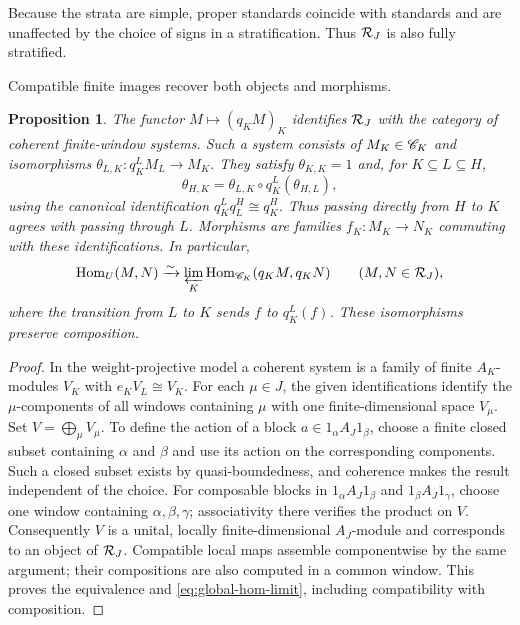 \documentclass[11pt,reqno]{amsart}
\newcommand{\Hom}{\operatorname{Hom}}\newcommand{\End}{\operatorname{End}}\newcommand{\Ext}{\operatorname{Ext}}
\newtheorem{proposition}[theorem]{Proposition}
\theoremstyle{definition}
\theoremstyle{remark}
\numberwithin{equation}{section}
\begin{document}
Because the strata are simple, proper standards coincide with
standards and are unaffected by the choice of signs in a
stratification. Thus $\mathcal R_J$ is also fully stratified.

Compatible finite images recover both objects and morphisms.

\begin{proposition}\label{prop:coherent-reconstruction}
The functor $M\mapsto(q_KM)_K$ identifies $\mathcal R_J$ with the category
of coherent finite-window systems. Such a system consists of
$M_K\in\mathscr C_K$ and isomorphisms
$\theta_{L,K}:q_K^LM_L\to M_K$. They satisfy $\theta_{K,K}=1$ and,
for $K\subseteq L\subseteq H$,
\[
 \theta_{H,K}=\theta_{L,K}\circ q_K^L(\theta_{H,L}),
\]
using the canonical identification $q_K^Lq_L^H\cong q_K^H$.
Thus passing directly from $H$ to $K$ agrees with passing through $L$.
Morphisms are families $f_K:M_K\to N_K$ commuting with these
identifications. In particular,
\begin{equation}\label{eq:global-hom-limit}
 \Hom_U(M,N)\xrightarrow{\sim}
 \varprojlim_K\Hom_{\CC_K}(q_KM,q_KN)
 \qquad(M,N\in\RR_J),
\end{equation}
where the transition from $L$ to $K$ sends $f$ to $q_K^L(f)$.
These isomorphisms preserve composition.
\end{proposition}

\begin{proof}
In the weight-projective model a coherent system is a family of finite
$A_K$-modules $V_K$ with $e_KV_L\cong V_K$. For each $\mu\in J$,
the given identifications identify the $\mu$-components of all
windows containing $\mu$ with one finite-dimensional space $V_\mu$.
Set $V=\bigoplus_\mu V_\mu$. To define the action of a block
$a\in1_\alpha A_J1_\beta$, choose a finite closed subset containing
$\alpha$ and $\beta$ and use its action on the corresponding
components. Such a closed subset exists by quasi-boundedness, and
coherence makes the result independent of the choice. For composable
blocks in $1_\alpha A_J1_\beta$ and $1_\beta A_J1_\gamma$,
choose one window containing $\alpha,\beta,\gamma$; associativity
there verifies the product on $V$. Consequently $V$ is a
unital, locally finite-dimensional $A_J$-module and corresponds to
an object of $\mathcal R_J$. Compatible local maps assemble componentwise
by the same argument; their compositions are also computed in a
common window. This proves the equivalence and
\eqref{eq:global-hom-limit}, including compatibility with composition.
\end{proof}
\end{document}
